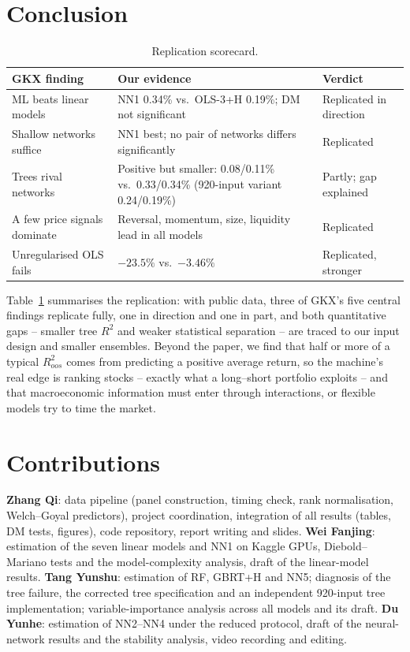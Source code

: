 \documentclass[10pt]{article}
\begin{document}
\section{Conclusion}
\begin{table}[h]\centering\footnotesize
\caption{Replication scorecard.}\label{tab:score}
\begin{tabular}{p{3.4cm}p{6.4cm}p{2.6cm}}
\toprule
GKX finding & Our evidence & Verdict\\
\midrule
ML beats linear models & NN1 0.34\% vs.\ OLS-3+H 0.19\%; DM not significant & Replicated in direction\\
Shallow networks suffice & NN1 best; no pair of networks differs significantly & Replicated\\
Trees rival networks & Positive but smaller: 0.08/0.11\% vs.\ 0.33/0.34\% (920-input variant 0.24/0.19\%) & Partly; gap explained\\
A few price signals dominate & Reversal, momentum, size, liquidity lead in all models & Replicated\\
Unregularised OLS fails & $-23.5\%$ vs.\ $-3.46\%$ & Replicated, stronger\\
\bottomrule
\end{tabular}
\end{table}
Table~\ref{tab:score} summarises the replication: with public data, three of GKX's five central findings replicate fully,
one in direction and one in part, and both quantitative gaps -- smaller tree $R^2$ and weaker statistical separation -- are
traced to our input design and smaller ensembles. Beyond the paper, we find that half or more of a typical
$R^2_{oos}$ comes from predicting a positive average return, so the machine's real edge is ranking stocks -- exactly what a
long--short portfolio exploits -- and that macroeconomic information must enter through interactions, or flexible models
try to time the market.

\section*{Contributions}
\small
\textbf{Zhang Qi}: data pipeline (panel construction, timing check, rank normalisation, Welch--Goyal predictors), project
coordination, integration of all results (tables, DM tests, figures), code repository, report writing and slides.
\textbf{Wei Fanjing}: estimation of the seven linear models and NN1 on Kaggle GPUs, Diebold--Mariano tests and the
model-complexity analysis, draft of the linear-model results.
\textbf{Tang Yunshu}: estimation of RF, GBRT+H and NN5; diagnosis of the tree failure, the corrected tree specification and
an independent 920-input tree implementation; variable-importance analysis across all models and its draft.
\textbf{Du Yunhe}: estimation of NN2--NN4 under the reduced protocol, draft of the neural-network results and the
stability analysis, video recording and editing.
\end{document}
